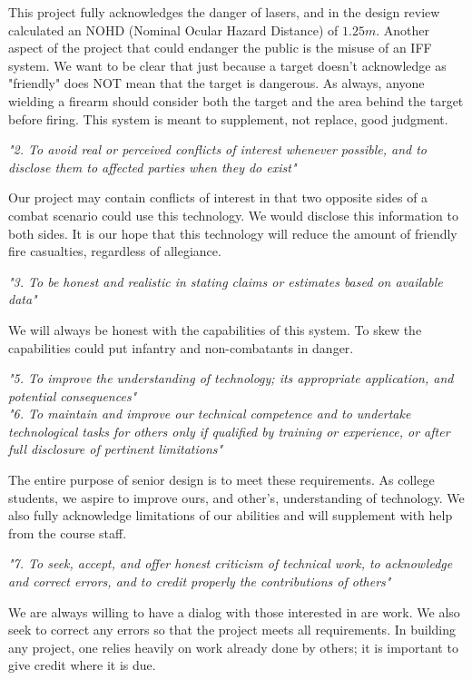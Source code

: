 \documentclass[letterpaper,10pt]{article}
\begin{document}
\begin{spacing}{1.15}
This project fully acknowledges the danger of lasers, and in the design review calculated an NOHD (Nominal Ocular Hazard Distance) of $1.25m$. Another aspect of the project that could endanger the public is the misuse of an IFF system. We want to be clear that just because a target doesn't acknowledge as "friendly" does NOT mean that the target is dangerous. As always, anyone wielding a firearm should consider both the target and the area behind the target before firing. This system is meant to supplement, not replace, good judgment.  

\textit{"2. To avoid real or perceived conflicts of interest whenever possible, and to disclose them to affected parties when they do exist"}

Our project may contain conflicts of interest in that two opposite sides of a combat scenario could use this technology. We would disclose this information to both sides. It is our hope that this technology will reduce the amount of friendly fire casualties, regardless of allegiance. 

\textit{"3. To be honest and realistic in stating claims or estimates based on available data"}

We will always be honest with the capabilities of this system. To skew the capabilities could put infantry and non-combatants in danger. 

\textit{"5. To improve the understanding of technology; its appropriate application, and potential consequences"}\\
\textit{"6. To maintain and improve our technical competence and to undertake technological tasks for others only if qualified by training or experience, or after full disclosure of pertinent limitations"}

The entire purpose of senior design is to meet these requirements. As college students, we aspire to improve ours, and other's, understanding of technology. We also fully acknowledge limitations of our abilities and will supplement with help from the course staff. 

\textit{"7. To seek, accept, and offer honest criticism of technical work, to acknowledge and correct errors, and to credit properly the contributions of others"}

We are always willing to have a dialog with those interested in are work. We also seek to correct any errors so that the project meets all requirements. In building any project, one relies heavily on work already done by others; it is important to give credit where it is due. 


\end{spacing}
\end{document}

